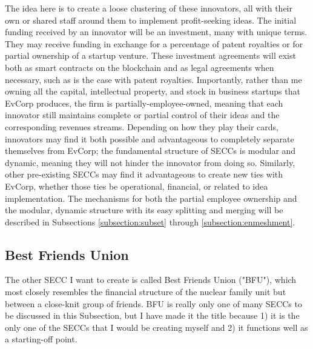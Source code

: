 \documentclass{article}[10pt]
\begin{document}
The idea here is to create a loose clustering of these innovators, all with their own or shared staff around them to implement profit-seeking ideas.
The initial funding received by an innovator will be an investment, many with unique terms.
They may receive funding in exchange for a percentage of patent royalties or for partial ownership of a startup venture.
These investment agreements will exist both as smart contracts on the blockchain and as legal agreements when necessary, such as is the case with patent royalties.
Importantly, rather than me owning all the capital, intellectual property, and stock in business startups that EvCorp produces, the firm is partially-employee-owned, meaning that each innovator still maintains complete or partial control of their ideas and the corresponding revenues streams.
Depending on how they play their cards, innovators may find it both possible and advantageous to completely separate themselves from EvCorp; the fundamental structure of SECCs is modular and dynamic, meaning they will not hinder the innovator from doing so.
Similarly, other pre-existing SECCs may find it advantageous to create new ties with EvCorp, whether those ties be operational, financial, or related to idea implementation.
The mechanisms for both the partial employee ownership and the modular, dynamic structure with its easy splitting and merging will be described in Subsections \ref{subsection:subset} through \ref{subsection:enmeshment}.\par



\subsection{Best Friends Union}
\label{subsection:BestFriendsUnion}

The other SECC I want to create is called Best Friends Union ("BFU"), which most closely resembles the financial structure of the nuclear family unit but between a close-knit group of friends.
BFU is really only one of many SECCs to be discussed in this Subsection, but I have made it the title because 1) it is the only one of the SECCs that I would be creating myself and 2) it functions well as a starting-off point. \par
\end{document}
